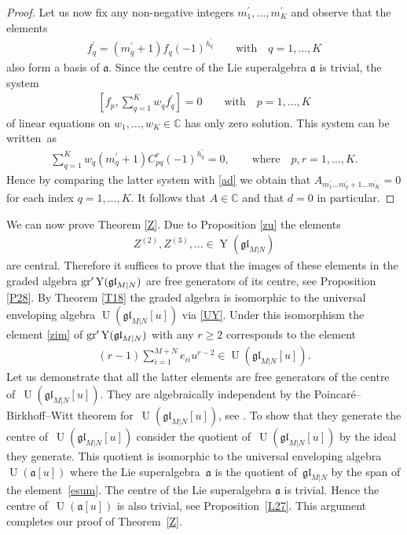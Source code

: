 \documentclass[pdftex]{sigma}
\numberwithin{equation}{section}
\def\a{\mathfrak{a}}
\def\CC{{\mathbb{C}}}
\def\g{\glMN [u]}
\def\ge{\geqslant}
\def\glMN{\mathfrak{gl}_{M|N}}
\def\grpr{{\rm gr}^{\prime} }
\def\Ua{\operatorname{U}(\a [u])}
\def\Ug{\operatorname{U}(\g)}
\def\YMN{\operatorname{Y}(\glMN)}
\begin{document}
\begin{proof}
Let us now fix any non-negative integers
$m_1^{\prime},\dots,m_K^{\prime}$
and observe that the elements
\begin{gather*}
f_q^{\prime}=(m_q^{\prime}+1) f_q
 (-1)^{h_{q}^{\prime}}
\qquad\text{with}\quad q=1,\dots, K
\end{gather*}
also form a basis of $\a $. Since the centre of
the Lie superalgebra $\a$ is trivial, the system
\begin{gather*}
\left[ f_p , \sum_{q=1}^K w_{q} f_q^{\prime} \right]=0
\qquad\text{with}\quad
p=1,\dots, K
\end{gather*}
of linear equations on $w_{1},\dots, w_{K}\in\CC$
has only zero solution. This system can be written~as
\begin{gather*}
\sum_{q=1}^K w_{q}
(m^{\prime}_q+1) C_{pq}^{r} (-1)^{h_{q}^{\prime}}=0,
\qquad\text{where}\quad
p ,r=1,\dots, K .
\end{gather*}
Hence by comparing the latter system with \eqref{ad} we obtain that
$A_{m_1^{\prime}\dots m^{\prime}_q+1\dots m^{\prime}_K}=0$
for each index $q=1,\dots, K $. It follows that $A\in\CC$
and that $d=0$ in particular.
\end{proof}

We can now prove Theorem \ref{Z}.
Due to Proposition \ref{zu} the elements
\begin{gather*}
Z^{(2)},Z^{(3)},\ldots\in\YMN
\end{gather*}
are central. Therefore it suffices to
prove that the images of these elements in the graded algebra
$\grpr\YMN$ are free generators of its centre, see Proposition \ref{P28}.
By Theorem \ref{T18} the graded algebra
is isomorphic to the universal enveloping algebra
$\Ug$ via \eqref{UY}. Under this isomorphism the element \eqref{zim}
of $\grpr\YMN$ with any $r\ge2$ corresponds to the element
\begin{gather*}
( r-1 ) \sum_{i=1}^{M+N}e_{ii} u^{r-2}\in\Ug .
\end{gather*}
Let us demonstrate that all the latter elements
are free generators of the centre of~$\Ug $.
They are algebraically independent
by the Poincar\'e--Birkhoff--Witt theorem for~$\Ug $, see \cite[Theorem~5.15]{MM}.
To show that they generate the centre of~$\Ug$ consider
the quotient of~$\Ug$ by the ideal
they generate. This quotient
is isomorphic to the universal enveloping algebra~$\Ua$
where the Lie superalgebra~$\a$ is the quotient of~$\glMN$ by the span of the element~\eqref{esum}.
The centre of the Lie superalgebra $\a$ is trivial.
Hence the centre of~$\Ua$ is also trivial, see Proposition~\ref{L27}.
This argument completes our proof of Theorem~\ref{Z}.
\end{document}

